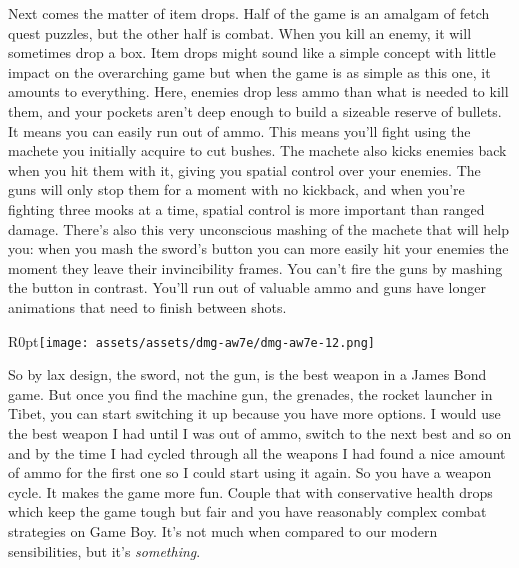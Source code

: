 \documentclass{book}
\begin{document}
\FloatBarrier\vspace{\baselineskip}\centering
\begin{minipage}{0.45\linewidth}\end{minipage}\vspace{2pt}
\begin{minipage}{0.45\linewidth}\end{minipage}
\par\justifying
Next comes the matter of item drops. Half of the game is an amalgam of fetch quest puzzles, but the other half is combat. When you kill an enemy, it will sometimes drop a box. Item drops might sound like a simple concept with little impact on the overarching game but when the game is as simple as this one, it amounts to everything. Here, enemies drop less ammo than what is needed to kill them, and your pockets aren’t deep enough to build a sizeable reserve of bullets. It means you can easily run out of ammo. This means you’ll fight using the machete you initially acquire to cut bushes. The machete also kicks enemies back when you hit them with it, giving you spatial control over your enemies. The guns will only stop them for a moment with no kickback, and when you’re fighting three mooks at a time, spatial control is more important than ranged damage. There’s also this very unconscious mashing of the machete that will help you: when you mash the sword’s button you can more easily hit your enemies the moment they leave their invincibility frames. You can’t fire the guns by mashing the button in contrast. You’ll run out of valuable ammo and guns have longer animations that need to finish between shots.\par
\begin{wrapfigure}{R}{0pt}{\texttt{[image: assets/assets/dmg-aw7e/dmg-aw7e-12.png]}}\end{wrapfigure}
So by lax design, the sword, not the gun, is the best weapon in a James Bond game. But once you find the machine gun, the grenades, the rocket launcher in Tibet, you can start switching it up because you have more options. I would use the best weapon I had until I was out of ammo, switch to the next best and so on and by the time I had cycled through all the weapons I had found a nice amount of ammo for the first one so I could start using it again. So you have a weapon cycle. It makes the game more fun. Couple that with conservative health drops which keep the game tough but fair and you have reasonably complex combat strategies on Game Boy. It’s not much when compared to our modern sensibilities, but it’s \emph{something}.\par
\end{document}
